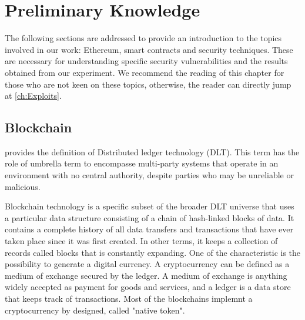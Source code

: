 

\lstset{style=mystyle}
\chapter{Preliminary Knowledge}
\label{ch:Backgroud}

The following sections are addressed to provide an introduction to the topics involved in our work: Ethereum, smart contracts and security techniques.
These are necessary for understanding specific security vulnerabilities and the results obtained from our experiment.
We recommend the reading of this chapter for those who are not keen on these topics, otherwise, the reader can directly jump at \autoref{ch:Exploits}.

\section{Blockchain}
\label{sec:Backgroud:Bitcoin}
\citet{DLT} provides the definition of Distributed ledger technology (DLT). 
This term has the role of umbrella term to encompasse multi-party 
systems that operate in an environment with no central authority, despite parties who may be 
unreliable or malicious. 

Blockchain technology is a specific subset of the broader DLT universe that uses a 
particular data structure consisting of a chain of hash-linked blocks of data.
It contains a complete history of all data transfers and transactions that have ever taken place since it was first created.
In other terms, it keeps a collection of records called blocks that is constantly expanding.
One of the characteristic is the possibility to generate a digital currency. 
A cryptocurrency can be defined as a  medium of exchange secured by the ledger.
A medium of exchange is anything widely accepted as payment for goods and services, and a ledger is a data store that keeps track of transactions. 
Most of the blockchains implemnt a cryptocurrency by designed, called "native token".

